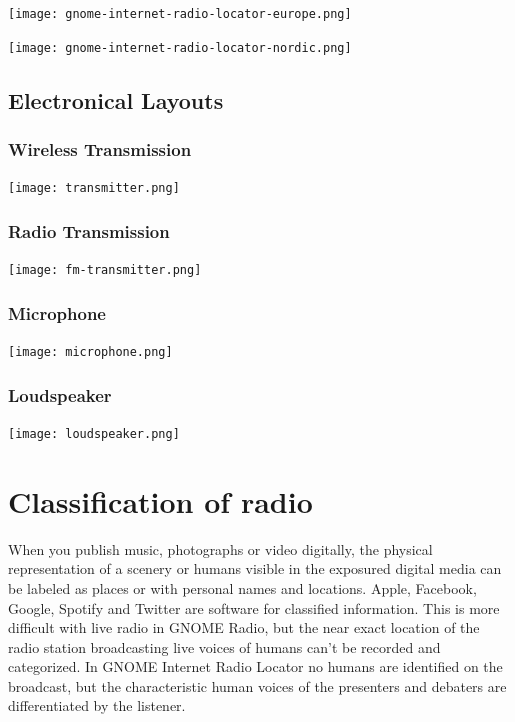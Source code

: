 \documentclass[a4paper,norsk,utf8]{report}
\begin{document}
\texttt{[image: gnome-internet-radio-locator-europe.png]}

\texttt{[image: gnome-internet-radio-locator-nordic.png]}

\chapter{Electronical Layouts}

\section{Wireless Transmission}

\texttt{[image: transmitter.png]}

\section{Radio Transmission}

\texttt{[image: fm-transmitter.png]}

\section{Microphone}

\texttt{[image: microphone.png]}



\section{Loudspeaker}

\texttt{[image: loudspeaker.png]}

\part{Classification of radio}

When you publish music, photographs or video digitally, the physical representation of a scenery or humans visible in the exposured digital media can be labeled as places or with personal names and locations.
Apple, Facebook, Google, Spotify and Twitter are software for classified information.
This is more difficult with live radio in GNOME Radio, but the near exact location of the radio station broadcasting live voices of humans can't be recorded and categorized.
In GNOME Internet Radio Locator no humans are identified on the broadcast, but the characteristic human voices of the presenters and debaters are differentiated by the listener.
\end{document}
